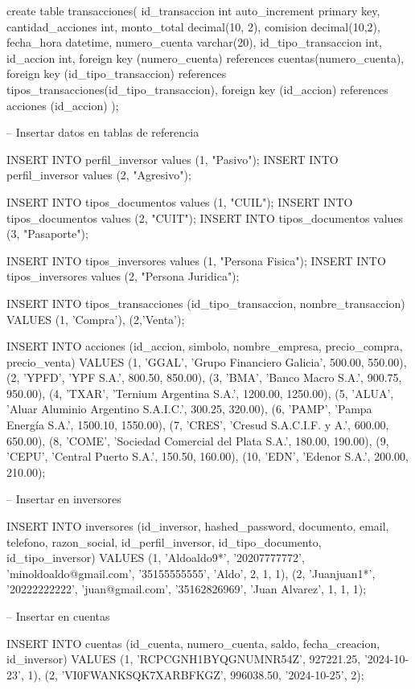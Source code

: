 create table transacciones(
    id_transaccion int auto_increment primary key,
    cantidad_acciones int,
    monto_total decimal(10, 2),
    comision decimal(10,2),
    fecha_hora datetime,
    numero_cuenta varchar(20),
    id_tipo_transaccion int,
    id_accion int,
    foreign key (numero_cuenta) references cuentas(numero_cuenta),
    foreign key (id_tipo_transaccion) references tipos_transacciones(id_tipo_transaccion),
    foreign key (id_accion) references acciones (id_accion)
);

-- Insertar datos en tablas de referencia

INSERT INTO perfil_inversor values (1, "Pasivo");
INSERT INTO perfil_inversor values (2, "Agresivo");

INSERT INTO tipos_documentos values (1, "CUIL");
INSERT INTO tipos_documentos values (2, "CUIT");
INSERT INTO tipos_documentos values (3, "Pasaporte");

INSERT INTO tipos_inversores values (1, "Persona Fisica");
INSERT INTO tipos_inversores values (2, "Persona Juridica");

INSERT INTO tipos_transacciones (id_tipo_transaccion, nombre_transaccion) VALUES (1, 'Compra'), (2,'Venta');

INSERT INTO acciones (id_accion, simbolo, nombre_empresa, precio_compra, precio_venta) VALUES 
(1, 'GGAL', 'Grupo Financiero Galicia', 500.00, 550.00),
(2, 'YPFD', 'YPF S.A.', 800.50, 850.00),
(3, 'BMA', 'Banco Macro S.A.', 900.75, 950.00),
(4, 'TXAR', 'Ternium Argentina S.A.', 1200.00, 1250.00),
(5, 'ALUA', 'Aluar Aluminio Argentino S.A.I.C.', 300.25, 320.00),
(6, 'PAMP', 'Pampa Energía S.A.', 1500.10, 1550.00),
(7, 'CRES', 'Cresud S.A.C.I.F. y A.', 600.00, 650.00),
(8, 'COME', 'Sociedad Comercial del Plata S.A.', 180.00, 190.00),
(9, 'CEPU', 'Central Puerto S.A.', 150.50, 160.00),
(10, 'EDN', 'Edenor S.A.', 200.00, 210.00);

-- Insertar en inversores

INSERT INTO inversores (id_inversor, hashed_password, documento, email, telefono, razon_social, id_perfil_inversor, id_tipo_documento, id_tipo_inversor)
VALUES 
(1, 'Aldoaldo9*', '20207777772', 'minoldoaldo@gmail.com', '35155555555', 'Aldo', 2, 1, 1),
(2, 'Juanjuan1*', '20222222222', 'juan@gmail.com', '35162826969', 'Juan Alvarez', 1, 1, 1);

-- Insertar en cuentas

INSERT INTO cuentas (id_cuenta, numero_cuenta, saldo, fecha_creacion, id_inversor)
VALUES 
(1, 'RCPCGNH1BYQGNUMNR54Z', 927221.25, '2024-10-23', 1),
(2, 'VI0FWANKSQK7XARBFKGZ', 996038.50, '2024-10-25', 2);

